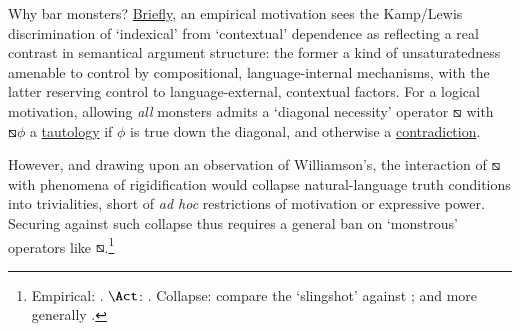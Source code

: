 \documentclass[12pt]{article}
\begin{document}
Why bar monsters? \ul{Briefly}, an empirical motivation sees the Kamp/Lewis discrimination
of `indexical' from `contextual' dependence as reflecting a real contrast in
semantical argument structure: the former a kind of unsaturatedness amenable
to control by compositional, language-internal mechanisms, with the latter
reserving control to language-external, contextual factors. 
For a logical
motivation, allowing \emph{all} monsters admits a `diagonal necessity'
operator $\boxbslash$ with $\boxbslash\phi$ a \ul{tautology} if
$\phi$ is true down the diagonal, and otherwise a \ul{contradiction}. 
\begin{comment}
Next, Williamson observes that the fundamental
conception of rigidification (the core phenomenon motivating 2D) motivates the
construction of a `universal rigidifier' $\Act$ such that, for any environment
$\Epsilon$ and sentence $\phi$, $\Epsilon\Act\phi$ is equivalent to
$(\phi\lmac\Epsilon\top) \land (\lnot\phi\lmac\Epsilon\bot)$ ($\top$/$\bot$
some `invariable' truth/falsehood). On the diagonal analysis of entailment,
$\Bd\Act\phi$ is then true at a diagonal point just if $(\phi\lmac\Bd\top)
\land (\lnot\phi\lmac\Bd\bot)$---equivalently: $(\lnot\phi\lmac\Bd\bot)$;
$(\lnot\phi\lmac\bot)$; $\phi$---is. But whatever the semantic behavior of
$\Act$, $\Bd\Act\phi$ is by stipulation either a triviality or a
contradiction---so $\phi$ is equivalent either to (and is itself thus) a
tautology or a contradiction. Short of \emph{ad hoc} restrictions of
motivation or expressive power, we must bar monsters to secure language
against triviality.
\end{comment}
However, and drawing upon an observation of Williamson's, the interaction of 
$\boxbslash$ with phenomena of rigidification 
would collapse natural-language truth conditions into trivialities, short of
\emph{ad hoc} restrictions of motivation or expressive power. Securing against
such collapse thus requires a general ban on `monstrous' operators like
$\boxbslash$.\footnote{Empirical:
\citep[pp.~31--2]{lewis80icc}. $\Act$: \citep{williamson09ca}. Collapse:
compare the \citep{church43c} `slingshot' against \citep{carnapis}; and more
generally \citep{Neale2001-NEAFF}.} 
\end{document}
